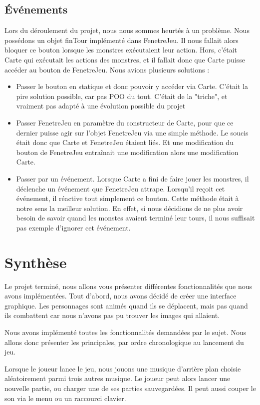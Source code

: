 \documentclass{article}
\begin{document}
  \subsection{Événements}
  Lors du déroulement du projet, nous nous sommes heurtés à un problème. 
  Nous possédons un objet finTour implémenté dans FenetreJeu. 
  Il nous fallait alors bloquer ce bouton lorsque les monstres exécutaient leur action.
  Hors, c'était Carte qui exécutait les actions des monstres, et il fallait donc que Carte puisse accéder au bouton de FenetreJeu.
  Nous avions plusieurs solutions :
  \begin{itemize}
    \item Passer le bouton en statique et donc pouvoir y accéder via Carte. C'était la pire solution possible, car pas POO du tout. 
    C'était de la "triche", et vraiment pas adapté à une évolution possible du projet
    \item Passer FenetreJeu en paramètre du constructeur de Carte, pour que ce dernier puisse agir sur l'objet FenetreJeu via une simple méthode.
    Le soucis était donc que Carte et FenetreJeu étaient liés. Et une modification du bouton de FenetreJeu entraînait une modification alors une modification Carte.
    \item Passer par un événement. Lorsque Carte a fini de faire jouer les monstres, il déclenche un événement que FenetreJeu attrape.
    Lorsqu'il reçoit cet événement, il réactive tout simplement ce bouton. Cette méthode était à notre sens la meilleur solution.
    En effet, si nous décidions de ne plus avoir besoin de savoir quand les monstes avaient terminé leur tours, il nous suffisait pas exemple d'ignorer cet événement.
  \end{itemize}
 

\section{Synthèse}
Le projet terminé, nous allons vous présenter différentes fonctionnalités que nous avons implémentées.
Tout d'abord, nous avons décidé de créer une interface graphique. 
Les personnages sont animés quand ils se déplacent, mais pas quand ils combattent car nous n'avons pas pu trouver les images qui allaient.

Nous avons implémenté toutes les fonctionnalités demandées par le sujet.
Nous allons donc présenter les principales, par ordre chronologique au lancement du jeu.

Lorsque le joueur lance le jeu, nous jouons une musique d'arrière plan choisie aléatoirement parmi trois autres musique.
Le joueur peut alors lancer une nouvelle partie, ou charger une de ses parties sauvegardées.
Il peut aussi couper le son via le menu ou un raccourci clavier.
\end{document}
